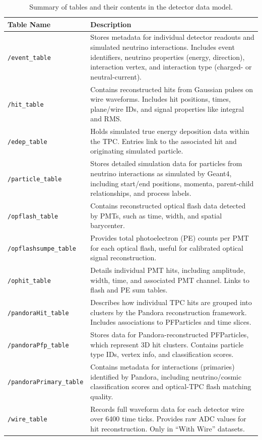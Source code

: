 \documentclass{pracalicmgr}
\begin{document}
\begin{table}[H]
\centering
\begin{tabular}{|l|p{10.5cm}|}
\hline
\textbf{Table Name} & \textbf{Description} \\
\hline
\texttt{/event\_table} & Stores metadata for individual detector readouts and simulated neutrino interactions. Includes event identifiers, neutrino properties (energy, direction), interaction vertex, and interaction type (charged- or neutral-current). \\
\hline
\texttt{/hit\_table} & Contains reconstructed hits from Gaussian pulses on wire waveforms. Includes hit positions, times, plane/wire IDs, and signal properties like integral and RMS. \\
\hline
\texttt{/edep\_table} & Holds simulated true energy deposition data within the TPC. Entries link to the associated hit and originating simulated particle. \\
\hline
\texttt{/particle\_table} & Stores detailed simulation data for particles from neutrino interactions as simulated by Geant4, including start/end positions, momenta, parent-child relationships, and process labels. \\
\hline
\texttt{/opflash\_table} & Contains reconstructed optical flash data detected by PMTs, such as time, width, and spatial barycenter. \\
\hline
\texttt{/opflashsumpe\_table} & Provides total photoelectron (PE) counts per PMT for each optical flash, useful for calibrated optical signal reconstruction. \\
\hline
\texttt{/ophit\_table} & Details individual PMT hits, including amplitude, width, time, and associated PMT channel. Links to flash and PE sum tables. \\
\hline
\texttt{/pandoraHit\_table} & Describes how individual TPC hits are grouped into clusters by the Pandora reconstruction framework. Includes associations to PFParticles and time slices. \\
\hline
\texttt{/pandoraPfp\_table} & Stores data for Pandora-reconstructed PFParticles, which represent 3D hit clusters. Contains particle type IDs, vertex info, and classification scores. \\
\hline
\texttt{/pandoraPrimary\_table} & Contains metadata for interactions (primaries) identified by Pandora, including neutrino/cosmic classification scores and optical-TPC flash matching quality. \\
\hline
\texttt{/wire\_table} & Records full waveform data for each detector wire over 6400 time ticks. Provides raw ADC values for hit reconstruction. Only in ``With Wire'' datasets. \\
\hline
\end{tabular}
\caption{Summary of tables and their contents in the detector data model.}
\label{tab:data_tables}
\end{table}

\newpage
\end{document}
